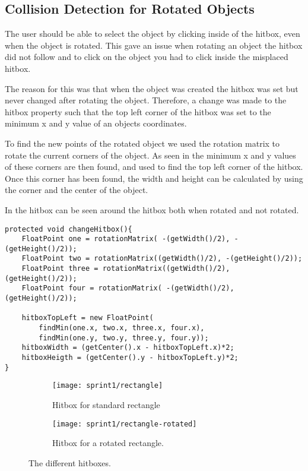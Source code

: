 \subsection{Collision Detection for Rotated Objects}
The user should be able to select the object by clicking inside of the hitbox, even when the object is rotated.
This gave an issue when rotating an object the hitbox did not follow and to click on the object you had to click inside the misplaced hitbox.

The reason for this was that when the object was created the hitbox was set but never changed after rotating the object.
Therefore, a change was made to the hitbox property such that the top left corner of the hitbox was set to the minimum x and y value of an objects coordinates.

To find the new points of the rotated object we used the rotation matrix to rotate the current corners of the object.
As seen in  the minimum x and y values of these corners are then found, and used to find the top left corner of the hitbox.
Once this corner has been found, the width and height can be calculated by using the corner and the center of the object.

In  the hitbox can be seen around the hitbox both when rotated and not rotated.

\begin{lstlisting}[caption={Method to change the hitbox},label=lst:changeHitbox]
protected void changeHitbox(){
	FloatPoint one = rotationMatrix( -(getWidth()/2), -(getHeight()/2));
	FloatPoint two = rotationMatrix((getWidth()/2), -(getHeight()/2));
	FloatPoint three = rotationMatrix((getWidth()/2), (getHeight()/2));
	FloatPoint four = rotationMatrix( -(getWidth()/2), (getHeight()/2));
	
	hitboxTopLeft = new FloatPoint(
	    findMin(one.x, two.x, three.x, four.x),
	    findMin(one.y, two.y, three.y, four.y));
	hitboxWidth = (getCenter().x - hitboxTopLeft.x)*2;
	hitboxHeigth = (getCenter().y - hitboxTopLeft.y)*2;
}
\end{lstlisting}



\begin{figure}[h]
	\centering
	\begin{subfigure}[b]{0.45\textwidth}
		\centering
		\texttt{[image: sprint1/rectangle]}
		\caption{Hitbox for standard rectangle}
		\label{figure:hitbox-rectangle}
	\end{subfigure}
	\qquad
	\begin{subfigure}[b]{0.45\textwidth}
		\centering
		\texttt{[image: sprint1/rectangle-rotated]}
		\caption{Hitbox for a rotated rectangle.}
		\label{figure:hitbox-rotated-rectangle}
	\end{subfigure}
	\caption{The different hitboxes.}
	\label{figure:hitbox}
\end{figure}

